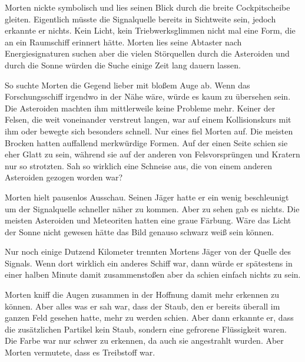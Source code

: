 \par

Morten nickte symbolisch und lies seinen Blick durch die breite Cockpitscheibe gleiten. Eigentlich müsste die Signalquelle bereits in Sichtweite sein, jedoch erkannte er nichts. Kein Licht, kein Triebwerksglimmen nicht mal eine Form, die an ein Raumschiff erinnert hätte. Morten lies seine Abtaster nach Energiesignaturen suchen aber die vielen Störquellen durch die Asteroiden und durch die Sonne würden die Suche einige Zeit lang dauern lassen.

\par

So suchte Morten die Gegend lieber mit bloßem Auge ab. Wenn das Forschungsschiff irgendwo in der Nähe wäre, würde es kaum zu übersehen sein. Die Asteroiden machten ihm mittlerweile keine Probleme mehr. Keiner der Felsen, die weit voneinander verstreut langen, war auf einem Kollisionskurs mit ihm oder bewegte sich besonders schnell. Nur eines fiel Morten auf. Die meisten Brocken hatten auffallend merkwürdige Formen. Auf der einen Seite schien sie eher Glatt zu sein, während sie auf der anderen von Felsvorsprüngen und Kratern nur so strotzten. Sah so wirklich eine Schneise aus, die von einem anderen Asteroiden gezogen worden war?

\par

Morten hielt pausenlos Ausschau. Seinen Jäger hatte er ein wenig beschleunigt um der Signalquelle schneller näher zu kommen. Aber zu sehen gab es nichts. Die meisten Asteroiden und Meteoriten hatten eine graue Färbung. Wäre das Licht der Sonne nicht gewesen hätte das Bild genauso schwarz weiß sein können.

\par

Nur noch einige Dutzend Kilometer trennten Mortens Jäger von der Quelle des Signals. Wenn dort wirklich ein anderes Schiff war, dann würde er spätestens in einer halben Minute damit zusammenstoßen aber da schien einfach nichts zu sein.

\par

Morten kniff die Augen zusammen in der Hoffnung damit mehr erkennen zu können. Aber alles was er sah war, dass der Staub, den er bereits überall im ganzen Feld gesehen hatte, mehr zu werden schien. Aber dann erkannte er, dass die zusätzlichen Partikel kein Staub, sondern eine gefrorene Flüssigkeit waren. Die Farbe war nur schwer zu erkennen, da auch sie angestrahlt wurden. Aber Morten vermutete, dass es Treibstoff war.

